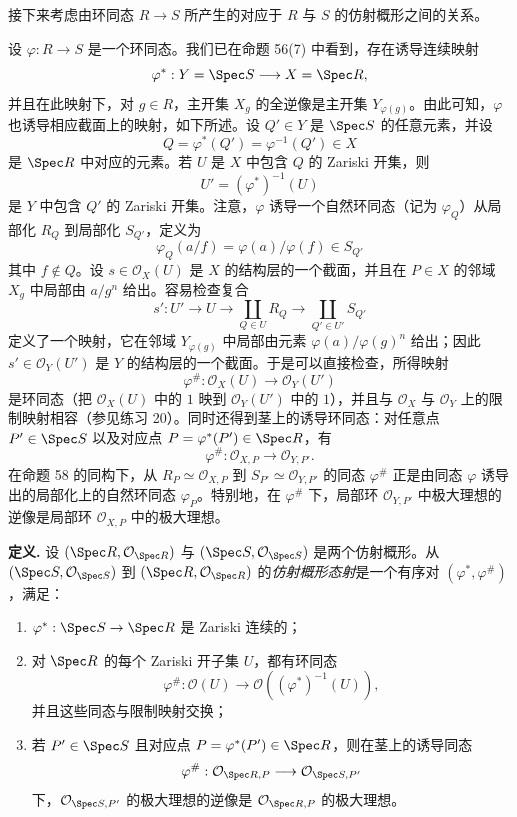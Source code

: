接下来考虑由环同态 $R\to S$ 所产生的对应于 $R$ 与 $S$ 的仿射概形之间的关系。

设 $\varphi:R\to S$ 是一个环同态。我们已在命题 56(7) 中看到，存在诱导连续映射
\[
\varphi^*:Y=\Spec S\longrightarrow X=\Spec R,
\]
并且在此映射下，对 $g\in R$，主开集 $X_g$ 的全逆像是主开集 $Y_{\varphi(g)}$。由此可知，$\varphi$ 也诱导相应截面上的映射，如下所述。设 $Q'\in Y$ 是 $\Spec S$ 的任意元素，并设
\[
Q=\varphi^*(Q')=\varphi^{-1}(Q')\in X
\]
是 $\Spec R$ 中对应的元素。若 $U$ 是 $X$ 中包含 $Q$ 的 Zariski 开集，则
\[
U'=(\varphi^*)^{-1}(U)
\]
是 $Y$ 中包含 $Q'$ 的 Zariski 开集。注意，$\varphi$ 诱导一个自然环同态（记为 $\varphi_Q$）从局部化 $R_Q$ 到局部化 $S_{Q'}$，定义为
\[
\varphi_Q(a/f)=\varphi(a)/\varphi(f)\in S_{Q'}
\]
其中 $f\notin Q$。设 $s\in\mathcal O_X(U)$ 是 $X$ 的结构层的一个截面，并且在 $P\in X$ 的邻域 $X_g$ 中局部由 $a/g^n$ 给出。容易检查复合
\[
s':U'\longrightarrow U\longrightarrow\coprod_{Q\in U}R_Q
\longrightarrow\coprod_{Q'\in U'}S_{Q'}
\]
定义了一个映射，它在邻域 $Y_{\varphi(g)}$ 中局部由元素 $\varphi(a)/\varphi(g)^n$ 给出；因此 $s'\in\mathcal O_Y(U')$ 是 $Y$ 的结构层的一个截面。于是可以直接检查，所得映射
\[
\varphi^\#:\mathcal O_X(U)\longrightarrow\mathcal O_Y(U')
\]
是环同态（把 $\mathcal O_X(U)$ 中的 $1$ 映到 $\mathcal O_Y(U')$ 中的 $1$），并且与 $\mathcal O_X$ 与 $\mathcal O_Y$ 上的限制映射相容（参见练习 20）。同时还得到茎上的诱导环同态：对任意点 $P'\in\Spec S$ 以及对应点 $P=\varphi^*(P')\in\Spec R$，有
\[
\varphi^\#: \mathcal O_{X,P}\longrightarrow\mathcal O_{Y,P'}.
\]
在命题 58 的同构下，从 $R_P\simeq\mathcal O_{X,P}$ 到 $S_{P'}\simeq\mathcal O_{Y,P'}$ 的同态 $\varphi^\#$ 正是由同态 $\varphi$ 诱导出的局部化上的自然环同态 $\varphi_P$。特别地，在 $\varphi^\#$ 下，局部环 $\mathcal O_{Y,P'}$ 中极大理想的逆像是局部环 $\mathcal O_{X,P}$ 中的极大理想。

\noindent\textbf{定义.} 设 $(\Spec R,\mathcal O_{\Spec R})$ 与 $(\Spec S,\mathcal O_{\Spec S})$ 是两个仿射概形。从 $(\Spec S,\mathcal O_{\Spec S})$ 到 $(\Spec R,\mathcal O_{\Spec R})$ 的\emph{仿射概形态射}是一个有序对 $(\varphi^*,\varphi^\#)$，满足：
\begin{enumerate}[label=(\arabic*)]
	\item $\varphi^*:\Spec S\to\Spec R$ 是 Zariski 连续的；
	\item 对 $\Spec R$ 的每个 Zariski 开子集 $U$，都有环同态
	\[
	\varphi^\#:\mathcal O(U)\longrightarrow\mathcal O((\varphi^*)^{-1}(U)),
	\]
	并且这些同态与限制映射交换；
	\item 若 $P'\in\Spec S$ 且对应点 $P=\varphi^*(P')\in\Spec R$，则在茎上的诱导同态
	\[
	\varphi^\#: \mathcal O_{\Spec R,P}\longrightarrow \mathcal O_{\Spec S,P'}
	\]
	下，$\mathcal O_{\Spec S,P'}$ 的极大理想的逆像是 $\mathcal O_{\Spec R,P}$ 的极大理想。
\end{enumerate}

